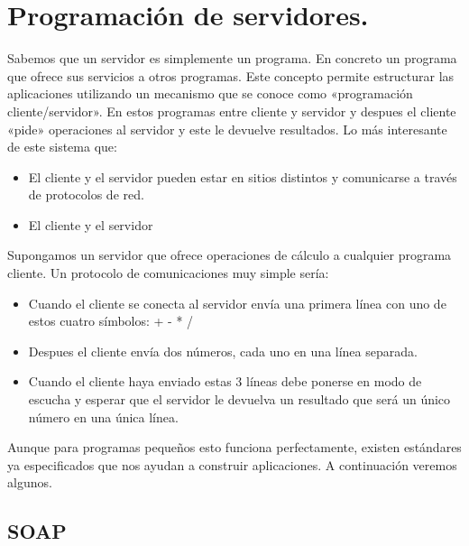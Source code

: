 \documentclass[letterpaper,10pt,spanish]{sphinxmanual}
\begin{document}
\section{Programación de servidores.}
\label{\detokenize{textos/tema4:programacion-de-servidores}}
Sabemos que un servidor es simplemente un programa. En concreto un programa que ofrece sus servicios a otros programas. Este concepto permite estructurar las aplicaciones utilizando un mecanismo que se conoce como «programación cliente/servidor». En estos programas  entre cliente y servidor y despues el cliente «pide» operaciones al servidor y este le devuelve resultados. Lo más interesante de este sistema que:
\begin{itemize}
\item {} 
El cliente y el servidor pueden estar en sitios distintos y comunicarse a través de protocolos de red.

\item {} 
El cliente y el servidor 

\end{itemize}

Supongamos un servidor que ofrece operaciones de cálculo a cualquier programa cliente. Un protocolo de comunicaciones muy simple sería:
\begin{itemize}
\item {} 
Cuando el cliente se conecta al servidor envía una primera línea con uno de estos cuatro símbolos: + - * /

\item {} 
Despues el cliente envía dos números, cada uno en una línea separada.

\item {} 
Cuando el cliente haya enviado estas 3 líneas debe ponerse en modo de escucha y esperar que el servidor le devuelva un resultado que será un único número en una única línea.

\end{itemize}

Aunque para programas pequeños esto funciona perfectamente, existen estándares ya especificados que nos ayudan a construir aplicaciones. A continuación veremos algunos.


\subsection{SOAP}
\label{\detokenize{textos/tema4:soap}}
\end{document}
